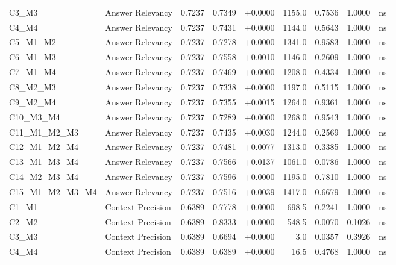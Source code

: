 \begin{table}[p]
\begin{tabular*}{\textwidth}{@{\extracolsep{\fill}} l l r r r r r r c @{}}
\addlinespace
C3\_M3          & Answer Relevancy     & 0.7237 & 0.7349 & +0.0000 & 1155.0 & 0.7536 & 1.0000 & ns \\
\addlinespace
C4\_M4          & Answer Relevancy     & 0.7237 & 0.7431 & +0.0000 & 1144.0 & 0.5643 & 1.0000 & ns \\
\addlinespace
C5\_M1\_M2      & Answer Relevancy     & 0.7237 & 0.7278 & +0.0000 & 1341.0 & 0.9583 & 1.0000 & ns \\
\addlinespace
C6\_M1\_M3      & Answer Relevancy     & 0.7237 & 0.7558 & +0.0010 & 1146.0 & 0.2609 & 1.0000 & ns \\
\addlinespace
C7\_M1\_M4      & Answer Relevancy     & 0.7237 & 0.7469 & +0.0000 & 1208.0 & 0.4334 & 1.0000 & ns \\
\addlinespace
C8\_M2\_M3      & Answer Relevancy     & 0.7237 & 0.7338 & +0.0000 & 1197.0 & 0.5115 & 1.0000 & ns \\
\addlinespace
C9\_M2\_M4      & Answer Relevancy     & 0.7237 & 0.7355 & +0.0015 & 1264.0 & 0.9361 & 1.0000 & ns \\
\addlinespace
C10\_M3\_M4     & Answer Relevancy     & 0.7237 & 0.7289 & +0.0000 & 1268.0 & 0.9543 & 1.0000 & ns \\
\addlinespace
C11\_M1\_M2\_M3 & Answer Relevancy     & 0.7237 & 0.7435 & +0.0030 & 1244.0 & 0.2569 & 1.0000 & ns \\
\addlinespace
C12\_M1\_M2\_M4 & Answer Relevancy     & 0.7237 & 0.7481 & +0.0077 & 1313.0 & 0.3385 & 1.0000 & ns \\
\addlinespace
C13\_M1\_M3\_M4 & Answer Relevancy     & 0.7237 & 0.7566 & +0.0137 & 1061.0 & 0.0786 & 1.0000 & ns \\
\addlinespace
C14\_M2\_M3\_M4 & Answer Relevancy     & 0.7237 & 0.7596 & +0.0000 & 1195.0 & 0.7810 & 1.0000 & ns \\
\addlinespace
C15\_M1\_M2\_M3\_M4 & Answer Relevancy     & 0.7237 & 0.7516 & +0.0039 & 1417.0 & 0.6679 & 1.0000 & ns \\
\addlinespace
C1\_M1          & Context Precision    & 0.6389 & 0.7778 & +0.0000 & 698.5 & 0.2241 & 1.0000 & ns \\
\addlinespace
C2\_M2          & Context Precision    & 0.6389 & 0.8333 & +0.0000 & 548.5 & 0.0070 & 0.1026 & ns \\
\addlinespace
C3\_M3          & Context Precision    & 0.6389 & 0.6694 & +0.0000 & 3.0 & 0.0357 & 0.3926 & ns \\
\addlinespace
C4\_M4          & Context Precision    & 0.6389 & 0.6389 & +0.0000 & 16.5 & 0.4768 & 1.0000 & ns \\

\end{tabular*}
\end{table}
